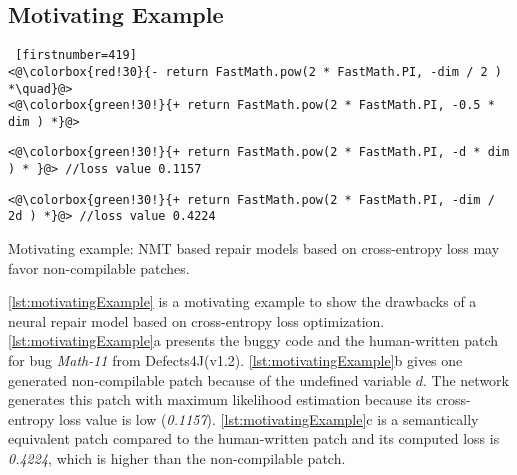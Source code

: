 \subsection{Motivating Example}
\label{sec:motivating-example}

\begin{listing}[t!]
\noindent\begin{minipage}[b]{0.5\textwidth}
    \begin{lstlisting} [firstnumber=419] 
<@\colorbox{red!30}{- return FastMath.pow(2 * FastMath.PI, -dim / 2 ) *\quad}@>           
<@\colorbox{green!30!}{+ return FastMath.pow(2 * FastMath.PI, -0.5 * dim ) *}@>
    \end{lstlisting}
 
   \label{motivate-human-patch}  
    \end{minipage}%
    \hfill
    \begin{minipage}[b]{0.49\textwidth}
    \begin{lstlisting}[firstnumber=419] 
<@\colorbox{green!30!}{+ return FastMath.pow(2 * FastMath.PI, -d * dim ) * }@> //loss value 0.1157 
    \end{lstlisting}
 
 \label{motivate-noncompile-patch}   
\end{minipage}%
\hfill
    \begin{minipage}[b]{0.49\textwidth}
    \begin{lstlisting}[firstnumber=419] 
<@\colorbox{green!30!}{+ return FastMath.pow(2 * FastMath.PI, -dim / 2d ) *}@> //loss value 0.4224 
    \end{lstlisting} 
    \label{motivate-correct-patch} 
\end{minipage}%
\caption{Motivating example: NMT based repair models based on cross-entropy loss may favor non-compilable patches.}
\label{lst:motivatingExample}
\end{listing}

\autoref{lst:motivatingExample} is a motivating example to show the drawbacks of a neural repair model based on cross-entropy loss optimization. 
\autoref{lst:motivatingExample}a presents the buggy code and the human-written patch for bug \textit{Math-11} from Defects4J(v1.2).
\autoref{lst:motivatingExample}b  gives one  generated non-compilable patch because of the undefined variable $d$. The network generates this patch
with maximum likelihood estimation because its cross-entropy loss value is low (\textit{0.1157}).
\autoref{lst:motivatingExample}c is a semantically equivalent patch compared to the human-written patch and its computed loss is \textit{0.4224}, which is higher than the non-compilable patch.

